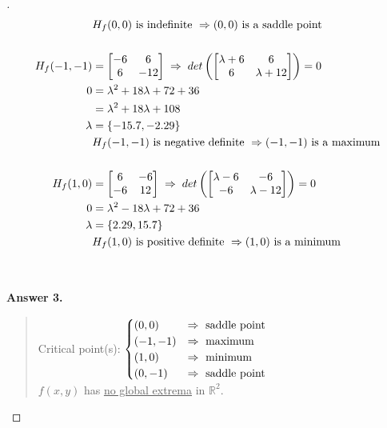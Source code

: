 \documentclass[12pt]{article}
\begin{document}
\begin{proof}[]
\begin{align*}
		& H_f(0, 0) \textnormal{ is indefinite } \Rightarrow (0,0) \textnormal{ is a saddle point} \\[15pt]
		H_f(-1, -1) &= \begin{bmatrix} -6 & 6 \\ 6 & -12 \end{bmatrix} \; \Rightarrow \; det\left( \begin{bmatrix} \lambda + 6 & 6 \\ 6 & \lambda + 12 \end{bmatrix} \right) = 0 \\
		0 &= \lambda^2 + 18\lambda + 72 + 36 \\
		 &= \lambda^2 + 18\lambda + 108 \\
		\lambda &= \left\lbrace -15.7, -2.29 \right\rbrace \\
		& H_f(-1, -1) \textnormal{ is negative definite } \Rightarrow (-1, -1) \textnormal{ is a maximum} \\[15pt]
		H_f(1, 0) &= \begin{bmatrix} 6 & -6 \\ -6 & 12 \end{bmatrix} \; \Rightarrow \; det\left( \begin{bmatrix} \lambda - 6 & - 6 \\ - 6 & \lambda - 12 \end{bmatrix} \right) = 0 \\
		0 &= \lambda^2 - 18\lambda + 72 + 36 \\
		\lambda &= \left\lbrace 2.29, 15.7 \right\rbrace \\
		& H_f(1, 0) \textnormal{ is positive definite } \Rightarrow (1, 0)  \textnormal{ is a minimum} \\[15pt]
	\end{align*} \vspace{-10mm} \\
	\textbf{Answer 3.} \vspace{-5mm} \\
	\begin{quote}
		Critical point(s): $ \begin{cases}
		(0, 0) & \Rightarrow \textnormal{ saddle point} \\
		(-1, -1) & \Rightarrow \textnormal{ maximum} \\
		(1, 0) & \Rightarrow \textnormal{ minimum} \\
		(0, -1) & \Rightarrow \textnormal{ saddle point}
		\end{cases}	$ \\
		$f(x,y)$ has \underline{no global extrema} in $\mathbb{R}^2$.
	\end{quote}
\end{proof}
\end{document}
